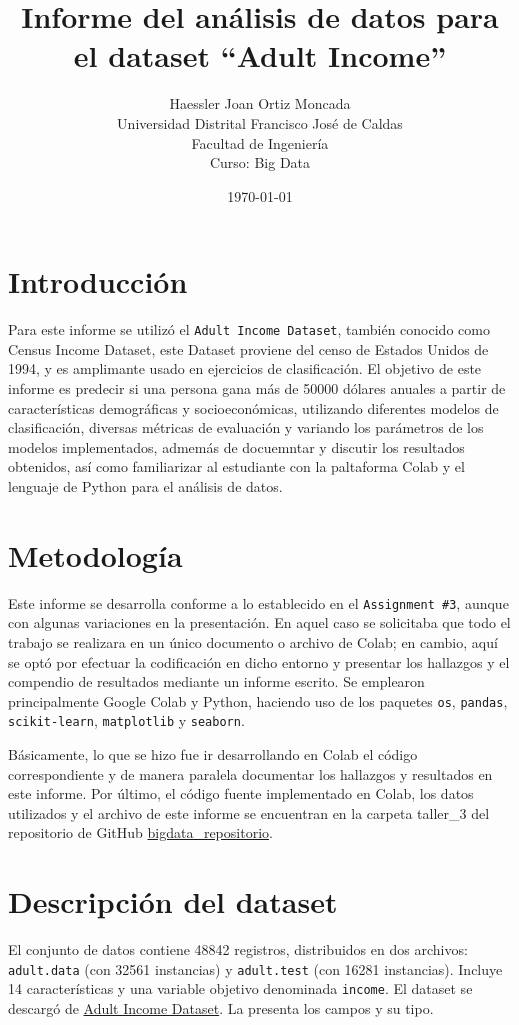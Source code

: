 \documentclass[12pt,a4paper]{article}
\title{\textbf{Informe del análisis de datos para el dataset ``Adult Income''}}
\author{Haessler Joan Ortiz Moncada \\[0.5cm]
        Universidad Distrital Francisco José de Caldas \\
        Facultad de Ingeniería \\
        Curso: Big Data}
\date{\today}
\begin{document}
\maketitle

\section{Introducción}
Para este informe se utilizó el  \texttt{Adult Income Dataset}, también conocido como Census Income Dataset,
este Dataset proviene del censo de Estados Unidos de 1994, y es amplimante usado en ejercicios de clasificación. 
El objetivo de este informe es predecir si una persona gana más de \num{50000} dólares anuales a partir 
de características demográficas y socioeconómicas, utilizando diferentes modelos de clasificación, diversas 
métricas de evaluación y variando los parámetros de los modelos implementados, admemás de docuemntar y discutir 
los resultados obtenidos, así como familiarizar al estudiante con la paltaforma Colab y el lenguaje de Python para 
el análisis de datos.

\section{Metodología}
Este informe se desarrolla conforme a lo establecido en el \texttt{Assignment \#3}, aunque con algunas variaciones 
en la presentación. En aquel caso se solicitaba que todo el trabajo se realizara en un único documento o 
archivo de Colab; en cambio, aquí se optó por efectuar la codificación en dicho entorno y presentar los 
hallazgos y el compendio de resultados mediante un informe escrito. Se emplearon principalmente Google Colab y Python, 
haciendo uso de los paquetes \texttt{os}, \texttt{pandas}, \texttt{scikit-learn}, \texttt{matplotlib} y \texttt{seaborn}.

Básicamente, lo que se hizo fue ir desarrollando en Colab el código correspondiente y de manera 
paralela documentar los hallazgos y resultados en este informe. Por último, el código fuente implementado en Colab, 
los datos utilizados y el archivo de este informe se encuentran en la carpeta taller\_3 del repositorio de 
GitHub \href{https://github.com/HaesslerOrtiz/bigdata}{bigdata\_repositorio}.

\section{Descripción del dataset}
El conjunto de datos contiene \num{48842} registros, distribuidos en dos archivos: 
\texttt{adult.data} (con \num{32561} instancias) y \texttt{adult.test} (con \num{16281} instancias). 
Incluye 14 características y una variable objetivo denominada \texttt{income}. El dataset se descargó de 
\href{https://archive.ics.uci.edu/dataset/2/adult}{Adult Income Dataset}.
La  presenta los campos y su tipo.
\end{document}
